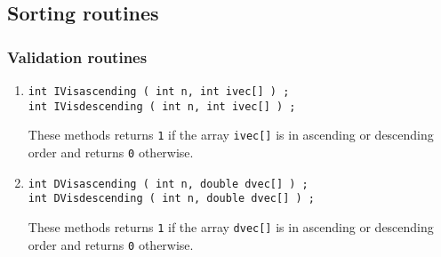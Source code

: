 \par
\subsection{Sorting routines}
\label{subsection:Utilities:proto:sort}
\par
\subsubsection{Validation routines}
\label{subsubsection:Utilities:proto:sort:validate}
\par
\begin{enumerate}
\item
\begin{verbatim}
int IVisascending ( int n, int ivec[] ) ;
int IVisdescending ( int n, int ivec[] ) ;
\end{verbatim}
These methods returns {\tt 1} if the array {\tt ivec[]} is in ascending
or descending order and returns {\tt 0} otherwise.
\item
\begin{verbatim}
int DVisascending ( int n, double dvec[] ) ;
int DVisdescending ( int n, double dvec[] ) ;
\end{verbatim}
These methods returns {\tt 1} if the array {\tt dvec[]} is in ascending
or descending order and returns {\tt 0} otherwise.
\end{enumerate}
\par
